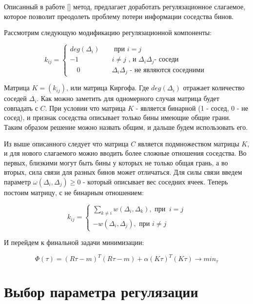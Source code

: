 \documentclass[a4paper,12pt]{diplom}
\renewcommand{\geq}{\geqslant}
\begin{document}
Описанный в работе [] метод, предлагает доработать регулязационное слагаемое, которое позволит преодолеть проблему потери информации 
соседства бинов.

Рассмотрим следующую модификацию регулязационной компоненты:

\begin{equation}
 k_{ij} =
  \begin{cases}
    deg(\Delta_{i}) & \quad \text{ при } i = j \\
     -1              & \quad i \neq j  \text{ , и } \Delta_{i} \Delta_{j} \text{- соседи } \\
\quad 0               & \quad \Delta_{i} \Delta_{j} \text{ - не являются соседними }
  \end{cases}
\end{equation}

Матрица $K = (k_{ij})$, или матрица Киргофа. Где $deg(\Delta_{i})$ отражает количество соседей $\Delta_{i}$. 
Как можно заметить для одномерного случая матрица будет совпадать 
с $C$. При условии что матрица $K$ - является бинарной (1 - сосед, 0 - не сосед), и признак соседства 
описывает только бины имеющие общие грани. Таким образом решение можно назвать общим, и дальше будем использовать его.

Из выше описанного следует что матрица $C$ является подмножеством матрицы $K$, и для нового слагаемого можно вводить более сложные
отношения соседства. Во первых, близкими могут быть бины у которых не только общая грань, а во вторых, сила связи для разных бинов
может отличаться. Для силы связи введем параметр $\omega(\Delta_{i}, \Delta_{j}) \geq 0$ - который описывает вес соседних ячеек. 
Теперь постоим матрицу, с не бинарным отношением:

\begin{equation}
 k_{ij} =
  \begin{cases}
    \displaystyle\sum_{k\neq i} w(\Delta_{i}, \Delta_{k}), \text{ при } \ i = j \\
    -w( \Delta_{i}, \Delta_{j} ), \text{ при } i \neq j
  \end{cases}
\end{equation}

И перейдем к финальной задачи минимизации:

\begin{equation}
   \Phi(\tau)=(R\tau-m)^T (R\tau-m) + \alpha(K\tau)^T(K\tau) \to min_{\tau}
   \label{min_n_dim}
\end{equation}
  

\section{Выбор параметра регулязации}
\end{document}
